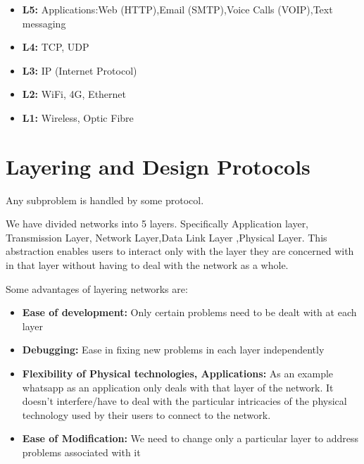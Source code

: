 \documentclass[12pt]{article}
\begin{document}
\begin{itemize}[itemsep = 0cm, parsep = 0cm, topsep = 0cm]
    \item \textbf{L5:} Applications:Web (HTTP),Email (SMTP),Voice Calls (VOIP),Text messaging
    \item \textbf{L4:} TCP, UDP
    \item \textbf{L3:} IP (Internet Protocol)
    \item \textbf{L2:} WiFi, 4G, Ethernet
    \item \textbf{L1:} Wireless, Optic Fibre
\end{itemize}

\section{Layering and Design Protocols}
Any subproblem is handled by some protocol.

We have divided networks into 
5 layers. Specifically Application layer, Transmission Layer, Network Layer,Data Link Layer ,Physical Layer.  
This abstraction enables users to interact only with the layer they are concerned with in that layer without having to deal with the 
network as a whole. 

Some advantages of layering networks are:
\begin{itemize}[itemsep = 0cm, parsep = 0cm, topsep = 0cm]
    \item \textbf{Ease of development:} Only certain problems need to be dealt with at each layer
    \item \textbf{Debugging:} Ease in fixing new problems in each layer independently
    \item \textbf{Flexibility of Physical technologies, Applications:} As an example whatsapp as an application 
    only deals with that layer of the network. It doesn't interfere/have to deal with the particular intricacies of the 
    physical technology used by their users to connect to the network.
    \item \textbf{Ease of Modification:} We need to change only a particular layer to address problems associated with it 
\end{itemize}
\end{document}
